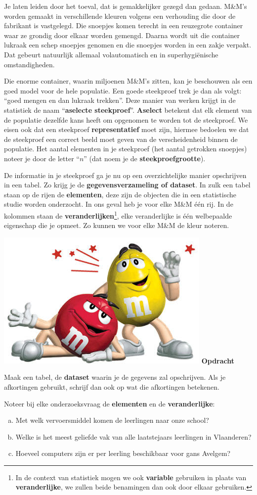 \documentclass[12pt,twoside]{article}
\newcounter{nmmopdracht}
\newenvironment{mmopdracht}
{
  \stepcounter{nmmopdracht}
  \vspace*{0.7cm}
  \begin{minipage}{\textwidth}
  {%
  \hspace*{-\marginparwidth}\includegraphics[width=\marginparwidth]{mmopdracht}
  \large\bf Opdracht \arabic{nmmopdracht}}
}{%
  \end{minipage}
}
\begin{document}
Je laten leiden door het toeval, dat is gemakkelijker gezegd dan gedaan. M\&M's worden gemaakt in verschillende
kleuren volgens een verhouding die door de fabrikant is vastgelegd. Die snoepjes komen terecht in
een reuzegrote container waar ze grondig door elkaar worden gemengd. Daarna wordt uit die
container lukraak een schep snoepjes genomen en die snoepjes worden in een zakje verpakt. Dat
gebeurt natuurlijk allemaal volautomatisch en in superhygiënische omstandigheden.

Die enorme container, waarin miljoenen M\&M’s zitten, kan je beschouwen als een goed model voor
de hele populatie. Een goede steekproef trek je dan als volgt: “goed mengen en dan lukraak trekken”.
Deze manier van werken krijgt in de statistiek de naam “{\bf aselecte steekproef}”. {\bf Aselect} betekent dat elk element van de populatie dezelfde kans heeft om opgenomen te worden tot de steekproef. We eisen ook dat een steekproef {\bf representatief} moet zijn, hiermee bedoelen we dat de steekproef een correct beeld moet geven van de verscheidenheid binnen de populatie. Het
aantal elementen in je steekproef (het aantal getrokken snoepjes) noteer je door de letter “$n$” (dat
noem je de {\bf steekproefgrootte}).

De informatie in je steekproef ga je nu op een overzichtelijke manier opschrijven in een tabel. Zo krijg je de
{\bf gegevensverzameling of dataset}. In zulk een tabel staan op de rijen de {\bf elementen}, deze zijn de objecten die in een statistische studie worden onderzocht. In ons geval heb je voor elke M\&M één rij. In de kolommen staan de {\bf veranderlijken}\footnote{In de context van statistiek mogen we ook {\bf variable} gebruiken in plaats van {\bf veranderlijke}, we zullen beide benamingen dan ook door elkaar gebruiken.}, elke veranderlijke is één welbepaalde eigenschap die je opmeet. Zo kunnen we voor elke M\&M de kleur noteren.



\begin{mmopdracht}
Maak een tabel, de {\bf dataset} waarin je de gegevens zal opschrijven. Als je afkortingen gebruikt, schrijf dan ook op wat die afkortingen betekenen.
\ruitjes{11cm}
\end{mmopdracht}

\begin{oefening}
Noteer bij elke onderzoeksvraag de {\bf elementen} en de {\bf veranderlijke}:
\begin{enumerate}[(a)]
  \item Met welk vervoersmiddel komen de leerlingen naar onze school?
  \item Welke is het meest geliefde vak van alle laatstejaars leerlingen in Vlaanderen?
  \item Hoeveel computers zijn er per leerling beschikbaar voor gans Avelgem?
\end{enumerate}
\end{oefening}
\end{document}
